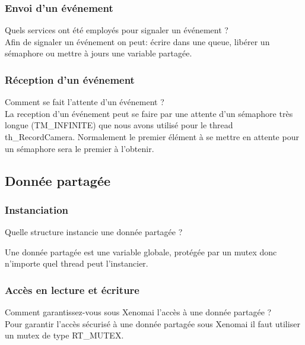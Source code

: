 \documentclass[11pt, a4paper]{paper}
\begin{document}
{{{ %
\subsubsection{Envoi d’un événement}
 {\color{blue} Quels services ont été employés pour signaler un événement ?} \\
 
 {\color{black} Afin de signaler un événement on peut: écrire dans une queue, libérer un sémaphore ou mettre à jours une variable partagée.}

\subsubsection{Réception d’un événement}
 {\color{blue} Comment se fait l'attente d'un événement ?}\\
 
 {\color{black} La reception d'un événement peut se faire par une attente d'un sémaphore très longue (TM\_INFINITE) que nous avons utilisé pour le thread th\_RecordCamera. Normalement le premier élément à se mettre en attente pour un sémaphore sera le premier à l'obtenir.}

\subsection{Donnée partagée}

\subsubsection{Instanciation}
 {\color{blue} Quelle structure instancie une donnée partagée ?}
 
 {\color{black} Une donnée partagée est une variable globale, protégée par un mutex donc n'importe quel thread peut l'instancier.

\subsubsection{Accès en lecture et écriture}
 {\color{blue} Comment garantissez-vous sous Xenomai l'accès à une donnée partagée ?}\\
 
 {\color{black} Pour garantir l'accès sécurisé à une donnée partagée sous Xenomai il faut utiliser un mutex de type RT\_MUTEX.}

}}}}
\end{document}
